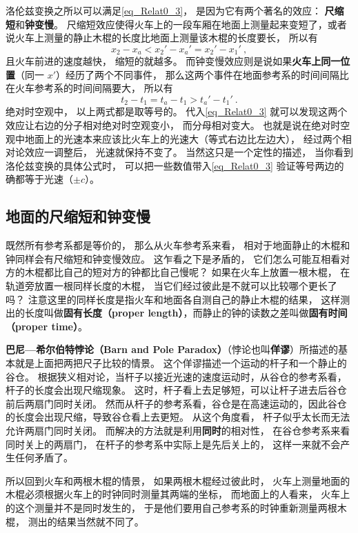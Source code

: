 洛伦兹变换之所以可以满足\autoref{eq_Relat0_3}， 是因为它有两个著名的效应： \textbf{尺缩短}和\textbf{钟变慢}。 尺缩短效应使得火车上的一段车厢在地面上测量起来变短了，或者说火车上测量的静止木棍的长度比地面上测量该木棍的长度要长， 所以有
\begin{equation}
x_2 - x_a < x_2'-x_a' = x_2' - x_1'~,
\end{equation}
且火车前进的速度越快， 缩短的就越多。 而钟变慢效应则是说如果\textbf{火车上同一位置}（同一 $x'$）经历了两个不同事件， 那么这两个事件在地面参考系的时间间隔比在火车参考系的时间间隔要大， 所以有
\begin{equation}
t_2 - t_1 = t_a - t_1 > t_a' - t_1'~.
\end{equation}
绝对时空观中， 以上两式都是取等号的。 代入\autoref{eq_Relat0_3} 就可以发现这两个效应让右边的分子相对绝对时空观变小， 而分母相对变大。 也就是说在绝对时空观中地面上的光速本来应该比火车上的光速大（等式右边比左边大）， 经过两个相对论效应一调整后， 光速就保持不变了。 当然这只是一个定性的描述， 当你看到洛伦兹变换的具体公式时， 可以把一些数值带入\autoref{eq_Relat0_3} 验证等号两边的确都等于光速（$\pm c$）。

\subsection{地面的尺缩短和钟变慢}
既然所有参考系都是等价的， 那么从火车参考系来看， 相对于地面静止的木棍和钟同样会有尺缩短和钟变慢效应。 这乍看之下是矛盾的， 它们怎么可能互相看对方的木棍都比自己的短对方的钟都比自己慢呢？ 如果在火车上放置一根木棍， 在轨道旁放置一根同样长度的木棍， 当它们经过彼此是不就可以比较哪个更长了吗？ 注意这里的同样长度是指火车和地面各自测自己的静止木棍的结果， 这样测出的长度叫做\textbf{固有长度（proper length）}，而静止的钟的读数之差叫做\textbf{固有时间（proper time）}。

\textbf{巴尼—希尔伯特悖论（Barn and Pole Paradox）}（悖论也叫\textbf{佯谬}）所描述的基本就是上面把两把尺子比较的情景。 这个佯谬描述一个运动的杆子和一个静止的谷仓。 根据狭义相对论，当杆子以接近光速的速度运动时，从谷仓的参考系看，杆子的长度会出现尺缩现象。 这时，杆子看上去足够短，可以让杆子进去后谷仓前后两扇门同时关闭。 然而从杆子的参考系看，谷仓是在高速运动的，因此谷仓的长度会出现尺缩，导致谷仓看上去更短。 从这个角度看， 杆子似乎太长而无法允许两扇门同时关闭。 而解决的方法就是利用\textbf{同时}的相对性， 在谷仓参考系来看同时关上的两扇门， 在杆子的参考系中实际上是先后关上的， 这样一来就不会产生任何矛盾了。

所以回到火车和两根木棍的情景， 如果两根木棍经过彼此时， 火车上测量地面的木棍必须根据火车上的时钟同时测量其两端的坐标， 而地面上的人看来， 火车上的这个测量并不是同时发生的， 于是他们要用自己参考系的时钟重新测量两根木棍， 测出的结果当然就不同了。

